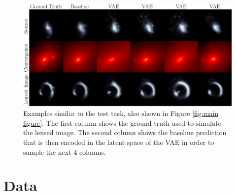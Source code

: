 \begin{figure}[t!]
        \centering
        \includegraphics[width=0.8\linewidth]{figures/vae_samples_similar_to_highlight}
        \caption{Examples similar to the test task, also shown in Figure \ref{fig:main figure}. The first column shows the ground truth used to simulate the lensed image. The second column shows the baseline prediction that is then encoded in the latent space of the VAE in order to sample the next 4 columns.
}
        \label{fig:vae fine-tuning}
\end{figure}





\section{Data}\label{sec:data}

